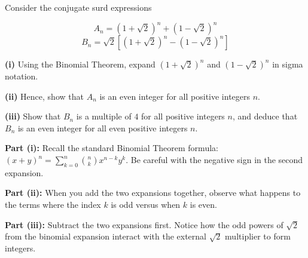 \begin{problem}
Consider the conjugate surd expressions 

$$A_n = (1+\sqrt{2})^n + (1-\sqrt{2})^n$$
$$
B_n = \sqrt{2}\left[(1+\sqrt{2})^n - (1-\sqrt{2})^n\right]
$$

\textbf{(i)} Using the Binomial Theorem, expand $(1+\sqrt{2})^n$ and $(1-\sqrt{2})^n$ in sigma notation.

\textbf{(ii)} Hence, show that $A_n$ is an even integer for all positive integers $n$.

\textbf{(iii)} Show that $B_n$ is a multiple of $4$ for all positive integers $n$, and deduce that $B_n$ is an even integer for all even positive integers $n$.
\end{problem}

\begin{hint}
    \item \textbf{Part (i):} Recall the standard Binomial Theorem formula: $(x+y)^n = \sum_{k=0}^n \binom{n}{k} x^{n-k}y^k$. Be careful with the negative sign in the second expansion.
    \item \textbf{Part (ii):} When you add the two expansions together, observe what happens to the terms where the index $k$ is odd versus when $k$ is even.
    \item \textbf{Part (iii):} Subtract the two expansions first. Notice how the odd powers of $\sqrt{2}$ from the binomial expansion interact with the external $\sqrt{2}$ multiplier to form integers.
\end{hint}

